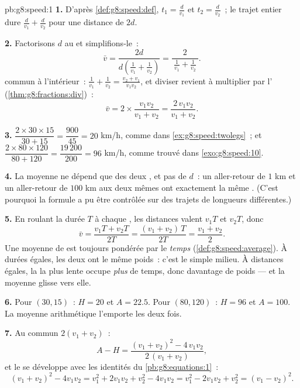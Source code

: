 \begin{solution}{pb:g8:speed:1}
\textbf{1.} D'après \cref{def:g8:speed:def}, $t_1 = \frac{d}{v_1}$
et $t_2 = \frac{d}{v_2}$~; le trajet entier dure
$\frac{d}{v_1} + \frac{d}{v_2}$ pour une distance de $2d$.

\textbf{2.} Factorisons $d$ au  et simplifions-le~:
\[
\bar v
= \frac{2d}{d\left(\frac{1}{v_1} + \frac{1}{v_2}\right)}
= \frac{2}{\ \frac{1}{v_1} + \frac{1}{v_2}\ } .
\]
 commun à l'intérieur~:
$\frac{1}{v_1} + \frac{1}{v_2} = \frac{v_2 + v_1}{v_1 v_2}$, et
diviser revient à multiplier par l'
(\cref{thm:g8:fractions:div})~:
\[
\bar v = 2 \times \frac{v_1 v_2}{v_1 + v_2}
= \frac{2\, v_1 v_2}{v_1 + v_2} .
\]

\textbf{3.} $\dfrac{2 \times 30 \times 15}{30 + 15}
= \dfrac{900}{45} = 20$ km/h, comme dans
\cref{ex:g8:speed:twolegs}~; et
$\dfrac{2 \times 80 \times 120}{80 + 120} = \dfrac{19\,200}{200}
= 96$ km/h, comme trouvé dans \cref{exo:g8:speed:10}.

\textbf{4.} La moyenne ne dépend que des deux , et pas de
$d$~: un aller-retour de $1$ km et un aller-retour de $100$ km aux
deux mêmes  ont exactement la même . (C'est
pourquoi la formule a pu être contrôlée sur des trajets de longueurs
différentes.)

\textbf{5.} En roulant la durée $T$ à chaque , les distances
valent $v_1 T$ et $v_2 T$, donc
\[
\bar v = \frac{v_1 T + v_2 T}{2T}
= \frac{(v_1 + v_2)\,T}{2T}
= \frac{v_1 + v_2}{2} .
\]
Une moyenne de  est toujours pondérée par le \emph{temps}
(\cref{def:g8:speed:average}). À durées égales, les deux 
ont le même poids~: c'est le simple milieu. À distances égales, la
 la plus lente occupe \emph{plus} de temps, donc davantage de
poids --- et la moyenne glisse vers elle.

\textbf{6.} Pour $(30, 15)$~: $H = 20$ et $A = 22.5$. Pour
$(80, 120)$~: $H = 96$ et $A = 100$. La moyenne arithmétique
l'emporte les deux fois.

\textbf{7.} Au  commun $2(v_1 + v_2)$~:
\[
A - H
= \frac{(v_1 + v_2)^2 - 4\, v_1 v_2}{2\,(v_1 + v_2)} ,
\]
et le  se développe avec les identités du
\cref{pb:g8:equations:1}~:
\[
(v_1 + v_2)^2 - 4 v_1 v_2
= v_1^2 + 2 v_1 v_2 + v_2^2 - 4 v_1 v_2
= v_1^2 - 2 v_1 v_2 + v_2^2
= (v_1 - v_2)^2 .
\]


\end{solution}
